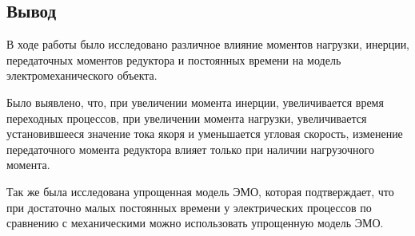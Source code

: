 \documentclass[a4paper, 12pt]{article}
\begin{document}
\begin{center}
	\section*{Вывод}
\end{center}\par
В ходе работы было исследовано различное влияние моментов нагрузки, инерции, передаточных моментов редуктора и постоянных времени на модель электромеханического объекта.\par
Было выявлено, что, при увеличении момента инерции, увеличивается время переходных процессов, при увеличении момента нагрузки, увеличивается установившееся значение тока якоря и уменьшается угловая скорость, изменение передаточного момента редуктора влияет только при наличии нагрузочного момента.\par
Так же была исследована упрощенная модель ЭМО, которая подтверждает, что при достаточно малых постоянных времени у электрических процессов по сравнению с механическими можно использовать упрощенную модель ЭМО.
\end{document}
